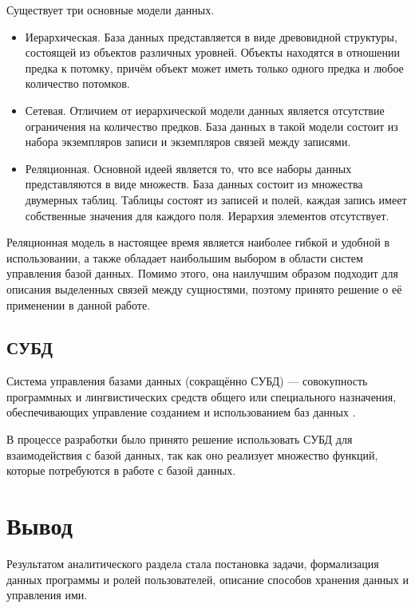 Существует три основные модели данных.
\begin{itemize}
	\item Иерархическая. База данных представляется в виде древовидной структуры, состоящей из объектов различных уровней. Объекты находятся в отношении предка к потомку, причём объект может иметь только одного предка и любое количество потомков.
	\item Сетевая. Отличием от иерархической модели данных является отсутствие ограничения на количество предков. База данных в такой модели состоит из набора экземпляров записи и экземпляров связей между записями.
	\item Реляционная. Основной идеей является то, что все наборы данных представляются в виде множеств. База данных состоит из множества двумерных таблиц. Таблицы состоят из записей и полей, каждая запись имеет собственные значения для каждого поля. Иерархия элементов отсутствует. 
\end{itemize}

Реляционная модель в настоящее время является наиболее гибкой и удобной в использовании, а также обладает наибольшим выбором в области систем управления базой данных. Помимо этого, она наилучшим образом подходит для описания выделенных связей между сущностями, поэтому принято решение о её применении в данной работе.


\subsection{СУБД}
Система управления базами данных (сокращённо СУБД) — совокупность
программных и лингвистических средств общего или специального назначения,
обеспечивающих управление созданием и использованием баз данных \cite{db_model}.

В процессе разработки было принято решение использовать СУБД для взаимодействия с базой данных, так как оно реализует множество функций, которые потребуются в работе с базой данных.


\section*{Вывод}
Результатом аналитического раздела стала постановка задачи, формализация данных программы и ролей пользователей, описание способов хранения данных и управления ими.
